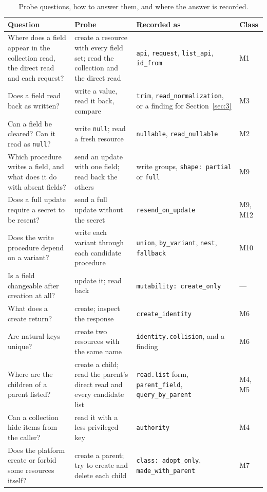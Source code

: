 \begin{table}[tbp]
\centering
\small
\caption{Probe questions, how to answer them, and where the answer is recorded.}
\label{tab:13}
\begin{tabularx}{\linewidth}{LLLl}
\toprule
Question & Probe & Recorded as & Class \\
\midrule
Where does a field appear in the collection read, the direct read and each request? & create a resource with every field set; read the collection and the direct read & \texttt{api}, \texttt{request}, \texttt{list\_api}, \texttt{id\_from} & M1 \\
Does a field read back as written? & write a value, read it back, compare & \texttt{trim}, \texttt{read\_normalization}, or a finding for Section~\ref{sec:3} & M3 \\
Can a field be cleared? Can it read as \texttt{null}? & write \texttt{null}; read a fresh resource & \texttt{nullable}, \texttt{read\_nullable} & M2 \\
Which procedure writes a field, and what does it do with absent fields? & send an update with one field; read back the others & write groups, \texttt{shape:\ partial} or \texttt{full} & M9 \\
Does a full update require a secret to be resent? & send a full update without the secret & \texttt{resend\_on\_update} & M9, M12 \\
Does the write procedure depend on a variant? & write each variant through each candidate procedure & \texttt{union}, \texttt{by\_variant}, \texttt{nest}, \texttt{fallback} & M10 \\
Is a field changeable after creation at all? & update it; read back & \texttt{mutability:\ create\_only} & --- \\
What does a create return? & create; inspect the response & \texttt{create\_identity} & M6 \\
Are natural keys unique? & create two resources with the same name & \texttt{identity.collision}, and a finding & M6 \\
Where are the children of a parent listed? & create a child; read the parent's direct read and every candidate list & \texttt{read.list} form, \texttt{parent\_field}, \texttt{query\_by\_parent} & M4, M5 \\
Can a collection hide items from the caller? & read it with a less privileged key & \texttt{authority} & M4 \\
Does the platform create or forbid some resources itself? & create a parent; try to create and delete each child & \texttt{class:\ adopt\_only}, \texttt{made\_with\_parent} & M7 \\

\end{tabularx}
\end{table}
